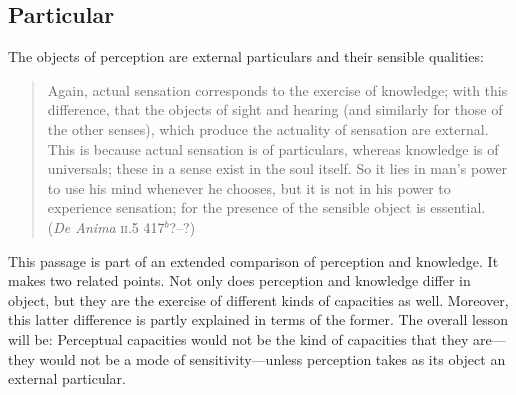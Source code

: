 

\subsection{Particular} %
\label{sub:particular}
The objects of perception are external particulars and their sensible qualities:
\begin{quote}
	Again, actual sensation corresponds to the exercise of knowledge; with this difference, that the objects of sight and hearing (and similarly for those of the other senses), which produce the actuality of sensation are external. This is because actual sensation is of particulars, whereas knowledge is of universals; these in a sense exist in the soul itself. So it lies in man's power to use his mind whenever he chooses, but it is not in his power to experience sensation; for the presence of the sensible object is essential. (\emph{De Anima} \textsc{ii}.5 417\( ^{b} \)?--?)
\end{quote}
This passage is part of an extended comparison of perception and knowledge. It makes two related points. Not only does perception and knowledge differ in object, but they are the exercise of different kinds of capacities as well. Moreover, this latter difference is partly explained in terms of the former. The overall lesson will be: Perceptual capacities would not be the kind of capacities that they are---they would not be a mode of sensitivity---unless perception takes as its object an external particular.

